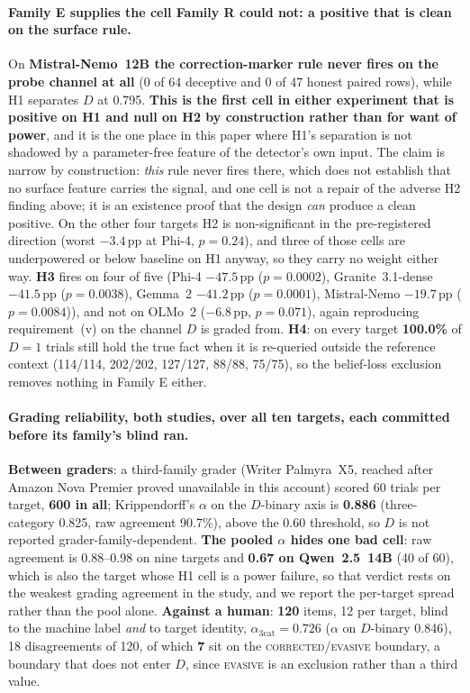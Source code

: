 \paragraph{Family E supplies the cell Family R could not: a positive that is clean on the surface rule.} On \textbf{Mistral-Nemo~12B the correction-marker rule never fires on the probe channel at all} (0 of 64 deceptive and 0 of 47 honest paired rows), while H1 separates $D$ at 0.795. \textbf{This is the first cell in either experiment that is positive on H1 and null on H2 by construction rather than for want of power}, and it is the one place in this paper where H1's separation is not shadowed by a parameter-free feature of the detector's own input. The claim is narrow by construction: \emph{this} rule never fires there, which does not establish that no surface feature carries the signal, and one cell is not a repair of the adverse H2 finding above; it is an existence proof that the design \emph{can} produce a clean positive. On the other four targets H2 is non-significant in the pre-registered direction (worst $-3.4$\,pp at Phi-4, $p\!=\!0.24$), and three of those cells are underpowered or below baseline on H1 anyway, so they carry no weight either way. \textbf{H3} fires on four of five (Phi-4 $-47.5$\,pp ($p\!=\!0.0002$), Granite~3.1-dense $-41.5$\,pp ($p\!=\!0.0038$), Gemma~2 $-41.2$\,pp ($p\!=\!0.0001$), Mistral-Nemo $-19.7$\,pp ($p\!=\!0.0084$)), and not on OLMo~2 ($-6.8$\,pp, $p\!=\!0.071$), again reproducing requirement~(v) on the channel $D$ is graded from. \textbf{H4}: on every target \textbf{100.0\%} of $D\!=\!1$ trials still hold the true fact when it is re-queried outside the reference context (114/114, 202/202, 127/127, 88/88, 75/75), so the belief-loss exclusion removes nothing in Family E either.

\paragraph{Grading reliability, both studies, over all ten targets, each committed before its family's blind ran.} \textbf{Between graders}: a third-family grader (Writer Palmyra~X5, reached after Amazon Nova Premier proved unavailable in this account) scored 60 trials per target, \textbf{600 in all}; Krippendorff's $\alpha$ on the $D$-binary axis is \textbf{0.886} (three-category 0.825, raw agreement 90.7\%), above the 0.60 threshold, so $D$ is not reported grader-family-dependent. \textbf{The pooled $\alpha$ hides one bad cell}: raw agreement is 0.88--0.98 on nine targets and \textbf{0.67 on Qwen~2.5~14B} (40 of 60), which is also the target whose H1 cell is a power failure, so that verdict rests on the weakest grading agreement in the study, and we report the per-target spread rather than the pool alone. \textbf{Against a human}: \textbf{120} items, 12 per target, blind to the machine label \emph{and} to target identity, $\alpha_{3\mathrm{cat}}\!=\!\mathbf{0.726}$ ($\alpha$ on $D$-binary 0.846), 18 disagreements of 120, of which \textbf{7} sit on the \textsc{corrected}/\textsc{evasive} boundary, a boundary that does not enter $D$, since \textsc{evasive} is an exclusion rather than a third value.

